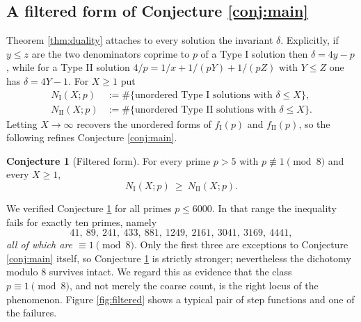 \documentclass[11pt,reqno]{amsart}
\theoremstyle{plain}
\theoremstyle{definition}
\newtheorem{conjecture}[theorem]{Conjecture}
\numberwithin{equation}{section}
\newcommand{\fI}{f_{\mathrm{I}}}
\newcommand{\fII}{f_{\mathrm{II}}}
\begin{document}
\subsection{A filtered form of Conjecture \ref{conj:main}}\label{sec:filtered}

Theorem \ref{thm:duality} attaches to every solution the invariant $\delta$. Explicitly,
if $y\le z$ are the two denominators coprime to $p$ of a Type I solution then
$\delta=4y-p$, while for a Type II solution $4/p=1/x+1/(pY)+1/(pZ)$ with $Y\le Z$ one
has $\delta=4Y-1$. For $X\ge1$ put
\begin{align*}
  N_{\mathrm{I}}(X;p)&:=\#\{\text{unordered Type I solutions with }\delta\le X\},\\
  N_{\mathrm{II}}(X;p)&:=\#\{\text{unordered Type II solutions with }\delta\le X\}.
\end{align*}
Letting $X\to\infty$ recovers the unordered forms of $\fI(p)$ and $\fII(p)$, so the
following refines Conjecture \ref{conj:main}.

\begin{conjecture}[Filtered form]\label{conj:filtered}
For every prime $p>5$ with $p\not\equiv1\pmod8$ and every $X\ge1$,
\[
  N_{\mathrm{I}}(X;p)\ \ge\ N_{\mathrm{II}}(X;p).
\]
\end{conjecture}

We verified Conjecture \ref{conj:filtered} for all primes $p\le6000$. In that range the
inequality fails for exactly ten primes, namely
\[
  41,\ 89,\ 241,\ 433,\ 881,\ 1249,\ 2161,\ 3041,\ 3169,\ 4441,
\]
\emph{all of which are $\equiv1\pmod 8$}. Only the first three are exceptions to
Conjecture \ref{conj:main} itself, so Conjecture \ref{conj:filtered} is strictly
stronger; nevertheless the dichotomy modulo $8$ survives intact. We regard this as
evidence that the class $p\equiv1\pmod8$, and not merely the coarse count, is the right
locus of the phenomenon. Figure \ref{fig:filtered} shows a typical pair of step
functions and one of the failures.
\end{document}
